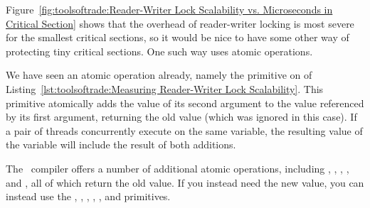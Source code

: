 %
Figure~\ref{fig:toolsoftrade:Reader-Writer Lock Scalability vs. Microseconds in Critical Section}
shows that the overhead of reader-writer locking is most severe for the
smallest critical sections, so it would be nice to have some other way
of protecting tiny critical sections.
One such way uses atomic operations.
\begin{fcvref}
We have seen an atomic operation already, namely the
 primitive on  of
Listing~\ref{lst:toolsoftrade:Measuring Reader-Writer Lock Scalability}.
This primitive atomically adds the value of its second argument to
the value referenced by its first argument, returning the old value
(which was ignored in this case).
If a pair of threads concurrently execute  on
the same variable, the resulting value of the variable will include
the result of both additions.
\end{fcvref}

The \GNUC\ compiler offers a number of additional atomic operations,
including ,
,
,
, and
, all of which return the old value.
If you instead need the new value, you can instead use the
,
,
,
,
, and
 primitives.

\QuickQuizEnd

